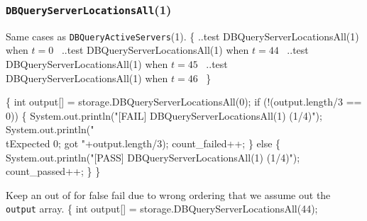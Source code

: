 \documentclass{article}
\def\nwendcode{\endtrivlist \endgroup}
\let\nwdocspar=\par
\begin{document}
\subsubsection{{\tt{}DBQueryServerLocationsAll}(1)}
Same cases as {\tt{}DBQueryActiveServers}(1).
\nwenddocs{}\endmoddef{}
\{
  \LA{}..test \code{}DBQueryServerLocationsAll\edoc{}(1) when $t=0$~{\nwtagstyle{}}\RA{}
  \LA{}..test \code{}DBQueryServerLocationsAll\edoc{}(1) when $t=44$~{\nwtagstyle{}}\RA{}
  \LA{}..test \code{}DBQueryServerLocationsAll\edoc{}(1) when $t=45$~{\nwtagstyle{}}\RA{}
  \LA{}..test \code{}DBQueryServerLocationsAll\edoc{}(1) when $t=46$~{\nwtagstyle{}}\RA{}
\}
\nwendcode{}\nwdocspar
\nwenddocs{}\endmoddef{}
\{
  int output[] = storage.DBQueryServerLocationsAll(0);
  if (!(output.length/3 == 0)) \{
    System.out.println("[FAIL] DBQueryServerLocationsAll(1) (1/4)");
    System.out.println("\\tExpected 0; got "+output.length/3);
    count_failed++;
  \} else \{
    System.out.println("[PASS] DBQueryServerLocationsAll(1) (1/4)");
    count_passed++;
  \}
\}
\nwendcode{}\nwdocspar
Keep an out of for false fail due to wrong ordering that we assume out
the {\tt{}output} array.
\nwenddocs{}\endmoddef{}
\{
  int output[] = storage.DBQueryServerLocationsAll(44);
\end{document}
